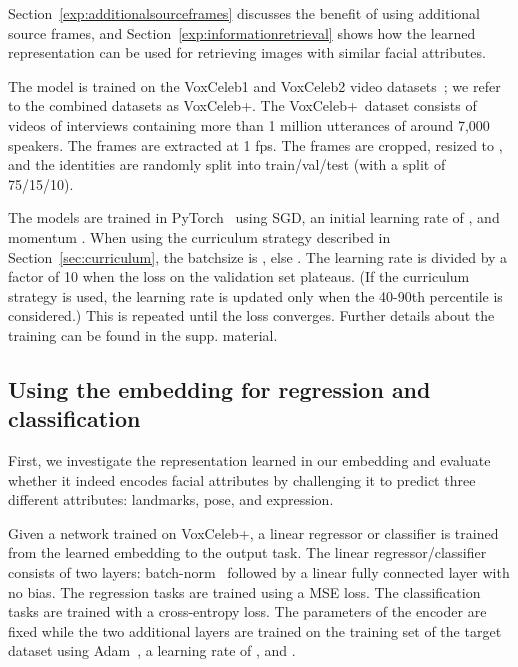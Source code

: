 \documentclass{bmvc2k}
\newcommand{\secref}[1]{Section~\ref{#1}}
\def\voxcombiname{VoxCeleb+}
\begin{document}
\secref{exp:additionalsourceframes} discusses the benefit  of using additional source frames,  and \secref{exp:informationretrieval} shows how the learned representation can be used for
retrieving images with similar facial attributes.

 The model is trained on the VoxCeleb1 and VoxCeleb2 video datasets~\cite{Nagrani17,Chung18a}; we refer to the combined datasets as \voxcombiname. The \voxcombiname~dataset consists of videos of interviews containing more than 1 million utterances of around 7,000 speakers. The frames are extracted at 1 fps.
The frames are cropped, resized to , and the identities are randomly split into train/val/test (with a split of 75/15/10).

The models are trained in PyTorch~\cite{Pytorch} using SGD, an initial learning rate of , and momentum . 
When using the curriculum strategy described in \secref{sec:curriculum}, the batchsize is , else . 
The learning rate is divided by a factor of 10 when the loss on the validation set plateaus.
(If the curriculum strategy is used, the learning rate is updated only when the 40-90th percentile is considered.)
This is repeated until the loss converges. Further details about the training can be found in the supp. material.




\subsection{Using the embedding for regression and classification}
\label{exp:embeddingclassifier}
First, we investigate the representation learned in our embedding and evaluate whether it indeed encodes facial attributes by challenging it to predict three different attributes: landmarks, pose, and expression.

Given a network trained on \voxcombiname, a linear regressor or classifier is trained from the learned embedding to the output task.
The linear regressor/classifier consists of two layers: batch-norm~\cite{ioffe2015batch} followed by a linear fully connected layer with no bias.
The regression tasks are trained using a MSE loss.
The classification tasks are trained with a cross-entropy loss.
The parameters of the encoder are fixed while the two additional layers are trained on the training set of the target dataset using Adam~\cite{Kingma15}, a learning rate of ,  and .
\end{document}
